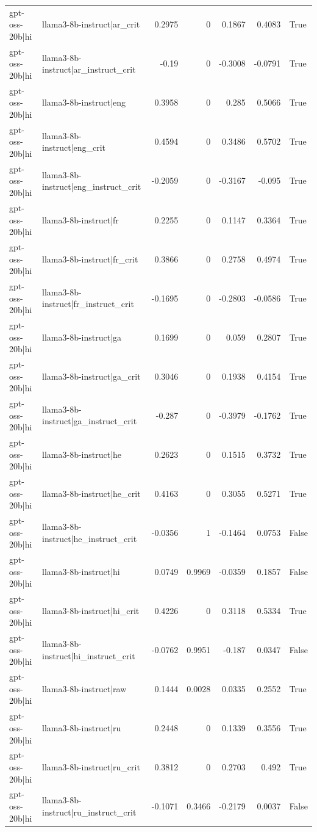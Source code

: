 \begin{table}
\begin{tabular}{l l r r r r l}
gpt-oss-20b|hi & llama3-8b-instruct|ar_crit & 0.2975 & 0 & 0.1867 & 0.4083 & True \\
gpt-oss-20b|hi & llama3-8b-instruct|ar_instruct_crit & -0.19 & 0 & -0.3008 & -0.0791 & True \\
gpt-oss-20b|hi & llama3-8b-instruct|eng & 0.3958 & 0 & 0.285 & 0.5066 & True \\
gpt-oss-20b|hi & llama3-8b-instruct|eng_crit & 0.4594 & 0 & 0.3486 & 0.5702 & True \\
gpt-oss-20b|hi & llama3-8b-instruct|eng_instruct_crit & -0.2059 & 0 & -0.3167 & -0.095 & True \\
gpt-oss-20b|hi & llama3-8b-instruct|fr & 0.2255 & 0 & 0.1147 & 0.3364 & True \\
gpt-oss-20b|hi & llama3-8b-instruct|fr_crit & 0.3866 & 0 & 0.2758 & 0.4974 & True \\
gpt-oss-20b|hi & llama3-8b-instruct|fr_instruct_crit & -0.1695 & 0 & -0.2803 & -0.0586 & True \\
gpt-oss-20b|hi & llama3-8b-instruct|ga & 0.1699 & 0 & 0.059 & 0.2807 & True \\
gpt-oss-20b|hi & llama3-8b-instruct|ga_crit & 0.3046 & 0 & 0.1938 & 0.4154 & True \\
gpt-oss-20b|hi & llama3-8b-instruct|ga_instruct_crit & -0.287 & 0 & -0.3979 & -0.1762 & True \\
gpt-oss-20b|hi & llama3-8b-instruct|he & 0.2623 & 0 & 0.1515 & 0.3732 & True \\
gpt-oss-20b|hi & llama3-8b-instruct|he_crit & 0.4163 & 0 & 0.3055 & 0.5271 & True \\
gpt-oss-20b|hi & llama3-8b-instruct|he_instruct_crit & -0.0356 & 1 & -0.1464 & 0.0753 & False \\
gpt-oss-20b|hi & llama3-8b-instruct|hi & 0.0749 & 0.9969 & -0.0359 & 0.1857 & False \\
gpt-oss-20b|hi & llama3-8b-instruct|hi_crit & 0.4226 & 0 & 0.3118 & 0.5334 & True \\
gpt-oss-20b|hi & llama3-8b-instruct|hi_instruct_crit & -0.0762 & 0.9951 & -0.187 & 0.0347 & False \\
gpt-oss-20b|hi & llama3-8b-instruct|raw & 0.1444 & 0.0028 & 0.0335 & 0.2552 & True \\
gpt-oss-20b|hi & llama3-8b-instruct|ru & 0.2448 & 0 & 0.1339 & 0.3556 & True \\
gpt-oss-20b|hi & llama3-8b-instruct|ru_crit & 0.3812 & 0 & 0.2703 & 0.492 & True \\
gpt-oss-20b|hi & llama3-8b-instruct|ru_instruct_crit & -0.1071 & 0.3466 & -0.2179 & 0.0037 & False \\

\end{tabular}
\end{table}
